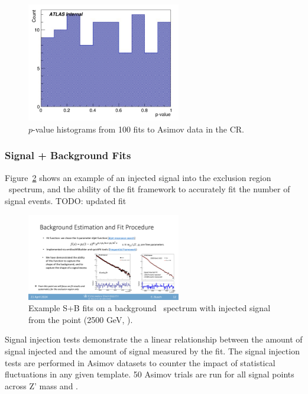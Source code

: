 \begin{figure}[!htbp]
\centering
   \includegraphics[width=0.6\textwidth]{figures/stats/asimov_cr_hist}
    \caption{$p$-value histograms from 100 fits to Asimov data in the CR. %
    \label{fig:asimov_hist}}
\end{figure}

\clearpage
\subsubsection{Signal + Background Fits}
\label{subsec:fit_splusb}

Figure~\ref{fig:splusb_sigInj} shows an example of an injected signal into the exclusion region \mt~spectrum, and the ability of the fit framework to accurately fit the number of signal events.
TODO: updated fit
\begin{figure}[!htbp]
\centering
   \includegraphics[width=0.6\textwidth]{figures/stats/splusb_sigInj}
    \caption{Example S+B fits on a background \mt~spectrum with injected signal from the point (2500 GeV, ).
    \label{fig:splusb_sigInj}}
\end{figure}

Signal injection tests demonstrate the a linear relationship between the amount of signal injected and the amount of signal measured by the fit.
The signal injection tests are performed in Asimov datasets to counter the impact of statistical fluctuations in any given template.
50 Asimov trials are run for all signal points across Z' mass and \rinv.


